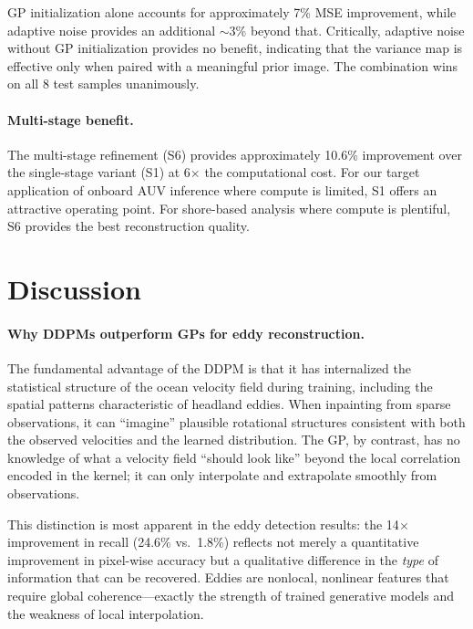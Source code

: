 \documentclass{article}
\begin{document}
GP initialization alone accounts for approximately 7\% MSE improvement, while adaptive noise provides an additional $\sim$3\% beyond that. Critically, adaptive noise without GP initialization provides no benefit, indicating that the variance map is effective only when paired with a meaningful prior image. The combination wins on all 8 test samples unanimously.

\paragraph{Multi-stage benefit.}
The multi-stage refinement (S6) provides approximately 10.6\% improvement over the single-stage variant (S1) at 6$\times$ the computational cost. For our target application of onboard AUV inference where compute is limited, S1 offers an attractive operating point. For shore-based analysis where compute is plentiful, S6 provides the best reconstruction quality.

\section{Discussion}
\label{sec:discussion}

\paragraph{Why DDPMs outperform GPs for eddy reconstruction.}
The fundamental advantage of the DDPM is that it has internalized the statistical structure of the ocean velocity field during training, including the spatial patterns characteristic of headland eddies. When inpainting from sparse observations, it can ``imagine'' plausible rotational structures consistent with both the observed velocities and the learned distribution. The GP, by contrast, has no knowledge of what a velocity field ``should look like'' beyond the local correlation encoded in the kernel; it can only interpolate and extrapolate smoothly from observations.

This distinction is most apparent in the eddy detection results: the 14$\times$ improvement in recall (24.6\% vs.\ 1.8\%) reflects not merely a quantitative improvement in pixel-wise accuracy but a qualitative difference in the \emph{type} of information that can be recovered. Eddies are nonlocal, nonlinear features that require global coherence---exactly the strength of trained generative models and the weakness of local interpolation.
\end{document}
